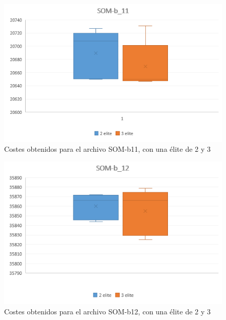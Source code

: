 	\begin{figure}[H]
		
		\centering
		\includegraphics[scale=0.7]{img/MPX_2vs3/SOM-b_11_Costes}
		\caption{Costes obtenidos para el archivo SOM-b11, con una élite de 2 y 3}
		\label{som-b11_coste}
		
	\end{figure}
	\begin{figure}[H]
		\centering
		\includegraphics[scale=0.7]{img/MPX_2vs3/SOM-b_12_Costes}
		\caption{Costes obtenidos para el archivo SOM-b12, con una élite de 2 y 3}
		\label{som-b12_coste}
		
	\end{figure}
